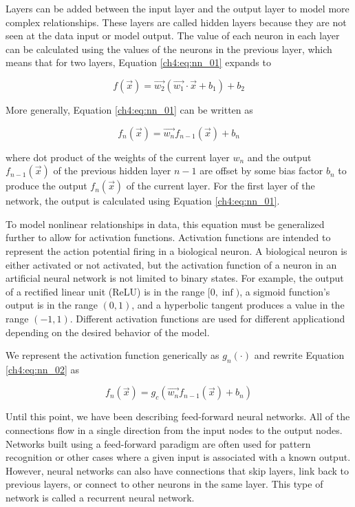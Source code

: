 Layers can be added between the input layer and the output layer to model more complex relationships. These layers are called hidden layers because they are not seen at the data input or model output. The value of each neuron in each layer can be calculated using the values of the neurons in the previous layer, which means that for two layers, Equation \ref{ch4:eq:nn_01} expands to

\begin{equation}
f(\vec{x}) = \vec{w_2} (\vec{w_1} \cdot \vec{x} + b_1) + b_2
\end{equation}

More generally, Equation \ref{ch4:eq:nn_01} can be written as

\begin{equation}
\label{ch4:eq:nn_02}
f_n(\vec{x}) = \vec{w_n} f_{n-1}(\vec{x})+ b_n
\end{equation}

\noindent where dot product of the weights of the current layer $w_n$ and the output $f_{n-1}(\vec{x})$ of the previous hidden layer $n-1$ are offset by some bias factor $b_n$ to produce the output $f_n(\vec{x})$ of the current layer. For the first layer of the network, the output is calculated using Equation \ref{ch4:eq:nn_01}.

To model nonlinear relationships in data, this equation must be generalized further to allow for activation functions. Activation functions are intended to represent the action potential firing in a biological neuron. A biological neuron is either activated or not activated, but the activation function of a neuron in an artificial neural network is not limited to binary states. For example, the output of a rectified linear unit (ReLU) is in the range $[0, \inf)$, a sigmoid function's output is in the range $(0, 1)$, and a hyperbolic tangent produces a value in the range $(-1, 1)$. Different activation functions are used for different applicationd depending on the desired behavior of the model.

We represent the activation function generically as $g_n(\cdot)$ and rewrite Equation \ref{ch4:eq:nn_02} as

\begin{equation}
\label{ch4:eq:nn_03}
f_n(\vec{x}) = g_c \left( \vec{w_n} f_{n-1}(\vec{x})+ b_n \right)
\end{equation}

Until this point, we have been describing feed-forward neural networks. All of the connections flow in a single direction from the input nodes to the output nodes. Networks built using a feed-forward paradigm are often used for pattern recognition or other cases where a given input is associated with a known output. However, neural networks can also have connections that skip layers, link back to previous layers, or connect to other neurons in the same layer. This type of network is called a recurrent neural network.

